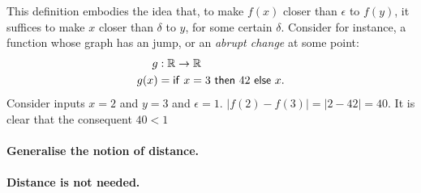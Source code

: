 This definition embodies the idea that, to make $f(x)$ closer than $\epsilon$ to $f(y)$, it
suffices to make $x$ closer than $\delta$ to $y$, for some certain $\delta$. Consider for instance,
a function whose graph has an jump, or an \emph{abrupt change} at some point:
\begin{align*}
  g    &: \mathbb{R}{} \rightarrow \mathbb{R}{}\\
  g(x) &= \mathsf{if}\ x = 3\ \mathsf{then}\ 42\ \mathsf{else}\ x.
\end{align*}
Consider inputs $x = 2$ and $y = 3$ and $\epsilon = 1$. $| f(2) - f(3) | = | 2 - 42 | = 40$. It
is clear that the consequent $40 < 1$

\paragraph{Generalise the notion of distance.}

\paragraph{Distance is not needed.}

\lipsum[1-3]


